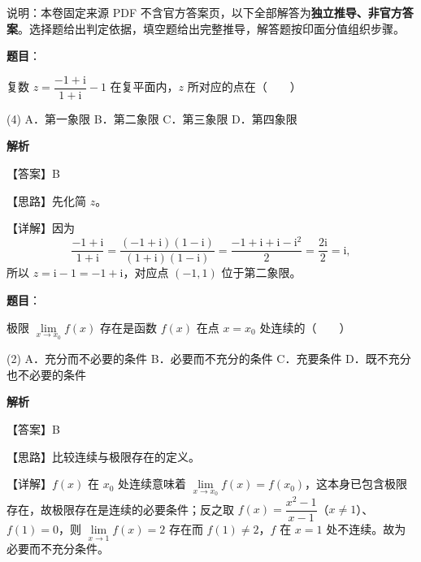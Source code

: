 
\begin{gktip}
说明：本卷固定来源 PDF 不含官方答案页，以下全部解答为\textbf{独立推导、非官方答案}。选择题给出判定依据，填空题给出完整推导，解答题按印面分值组织步骤。
\end{gktip}


\begin{answer}

\textbf{题目}：

复数 $z = \dfrac{-1+\mathrm{i}}{1+\mathrm{i}} - 1$ 在复平面内，$z$ 所对应的点在\mbox{（　　）}

\begin{gkopts}(4)
\task A．第一象限
\task B．第二象限
\task C．第三象限
\task D．第四象限
\end{gkopts}

\textbf{解析}

【答案】B

【思路】先化简 $z$。

【详解】因为
\nopagebreak[4]
\[
\frac{-1+\mathrm{i}}{1+\mathrm{i}} = \frac{(-1+\mathrm{i})(1-\mathrm{i})}{(1+\mathrm{i})(1-\mathrm{i})} = \frac{-1+\mathrm{i}+\mathrm{i}-\mathrm{i}^2}{2} = \frac{2\mathrm{i}}{2} = \mathrm{i},
\]
所以 $z = \mathrm{i} - 1 = -1 + \mathrm{i}$，对应点 $(-1, 1)$ 位于第二象限。


\end{answer}
\begin{answer}

\textbf{题目}：

极限 $\lim\limits_{x \to x_0} f(x)$ 存在是函数 $f(x)$ 在点 $x = x_0$ 处连续的\mbox{（　　）}

\begin{gkopts}(2)
\task A．充分而不必要的条件
\task B．必要而不充分的条件
\task C．充要条件
\task D．既不充分也不必要的条件
\end{gkopts}

\textbf{解析}

【答案】B

【思路】比较连续与极限存在的定义。

【详解】$f(x)$ 在 $x_0$ 处连续意味着 $\lim\limits_{x \to x_0} f(x) = f(x_0)$，这本身已包含极限存在，故极限存在是连续的必要条件；反之取 $f(x) = \dfrac{x^2-1}{x-1}$（$x \neq 1$）、$f(1) = 0$，则 $\lim\limits_{x \to 1} f(x) = 2$ 存在而 $f(1) \neq 2$，$f$ 在 $x = 1$ 处不连续。故为必要而不充分条件。


\end{answer}
